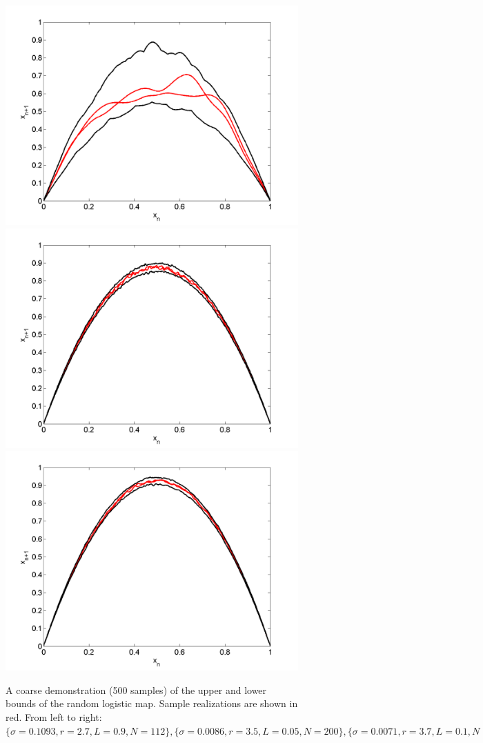 \begin{figure}[htp]
\caption[Upper and lower bounds on the random logistic map]{A coarse
  demonstration (500 samples) of the upper and lower bounds of the random logistic
  map. Sample realizations are shown in red. From left to right:
  $\{\sigma=0.1093,r=2.7,L=0.9,N=112\}, \{\sigma=0.0086,r=3.5,L=0.05,N=200\},\{\sigma=0.0071,r=3.7,L=0.1,N=100\}$
  }\label{fig:envelope}
\centering
\includegraphics[width=.3\textwidth]{figs/envelope_500_r27_L09.png}\hfill
\includegraphics[width=.3\textwidth]{figs/envelope_500_r35_L005.png}\hfill
\includegraphics[width=.3\textwidth]{figs/envelope_500_r37_L01.png}
\end{figure}

